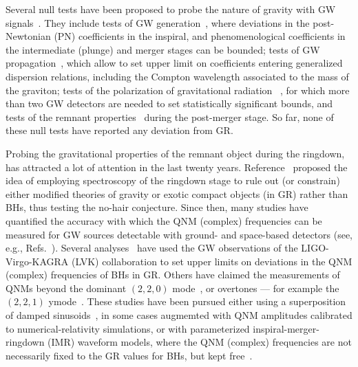 \documentclass[twocolumn,
               prd,
               aps,
               superscriptaddress,
               tightenlines,
               nofootinbib,
               eqsecnum,
               amsfonts,
               amsmath,
               longbibliography]{revtex4-1}
\begin{document}
Several null tests have been proposed to probe the nature of gravity with GW signals~\cite{TheLIGOScientific:2016src,Yunes:2016jcc,Abbott:2018lct,LIGOScientific:2019fpa,Abbott:2020jks,LIGOScientific:2021sio}. They include tests of GW generation~\cite{Arun:2006yw,Yunes:2009ke,Li:2011cg,Agathos:2013upa,Mehta:2022pcn}, where deviations in the post-Newtonian (PN) coefficients in the inspiral, and phenomenological coefficients in the intermediate (plunge) and merger stages can be bounded; tests of GW propagation~\cite{Will:1997bb}, which allow to set upper limit on coefficients entering generalized dispersion relations, including the Compton wavelength associated to the 
mass of the graviton; tests of the polarization of gravitational radiation~
\cite{Will:2014kxa}, for which more than 
two GW detectors are needed to set statistically significant bounds, and tests of the remnant properties~\cite{Meidam:2014jpa,Carullo:2018sfu,Brito:2018rfr,Carullo:2019flw,Isi:2019aib,Ghosh:2021mrv,Carullo:2021dui} 
during the post-merger stage. So far, none of these null tests have reported any deviation from GR. 

Probing the gravitational properties of the remnant object during the
ringdown, has attracted a lot of attention in the last twenty years. 
Reference~\cite{Dreyer:2003bv} proposed the idea of employing spectroscopy
of the ringdown stage to rule out (or constrain) either modified theories of 
gravity or exotic compact objects (in GR) rather than BHs, thus 
testing the no-hair conjecture. Since then, many studies have quantified the accuracy 
with which the QNM (complex) frequencies can be measured for
GW sources detectable with ground- and space-based detectors (see, e.g., Refs.~\cite{Berti:2005ys,Baibhav:2020tma,Bhagwat:2021kwv}). Several analyses~\cite{Carullo:2018sfu,
Brito:2018rfr,Carullo:2019flw,Isi:2019aib,Ghosh:2021mrv,Carullo:2021dui}  
have used the GW observations of the LIGO-Virgo-KAGRA (LVK) collaboration to set upper 
limits on deviations in the QNM (complex) frequencies of BHs in GR. Others have claimed 
the measurements of QNMs beyond the dominant $(2,2,0)$ mode~\cite{Capano:2021etf}, 
or overtones --- for example the $(2,2,1)$ ymode~\cite{Isi:2019aib,Cotesta:2022pci,Isi:2022mhy}. These studies have been pursued either using a superposition 
of damped sinusoids~\cite{Giesler:2019uxc,Carullo:2019flw}, in some cases augmemted with QNM amplitudes calibrated to 
numerical-relativity simulations, or with parameterized inspiral-merger-ringdown (IMR) 
waveform models, where the QNM (complex) frequencies are not necessarily fixed 
to the GR values for BHs, but kept free~\cite{Brito:2018rfr,Ghosh:2021mrv}.
\end{document}
